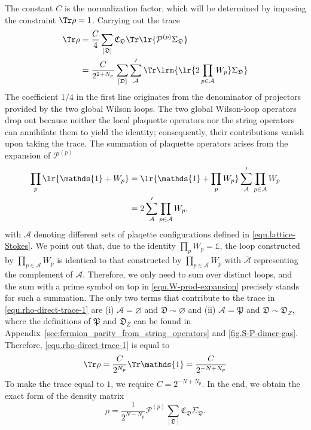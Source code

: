 The constant $C$ is the normalization factor, which will be determined by imposing the constraint $\Tr\rho = 1$. Carrying out the trace 
\begin{align}\label{equ.rho-direct-trace-1}
    \Tr\rho &= \frac{C}{4} \sum_{[\mathfrak{D}]} \mathfrak{C}_{\mathfrak{D}} \Tr\lr{\mathcal{P}^{(p)}\Sigma_{\mathfrak{D}}} \nonumber\\
    &= \frac{C}{2^{2+N_p}} \sum_{[\mathfrak{D}]} \sum_{\mathcal{A}}'\Tr\lrm{ \lr{2\prod_{p\in\mathcal{A}} W_p}\Sigma_{\mathfrak{D}}}
\end{align}
The coefficient $1/4$ in the first line originates from the denominator of projectors provided by the two global Wilson loops. The two global Wilson-loop operators drop out because neither the local plaquette operators nor the string operators can annihilate them to yield the identity; consequently, their contributions vanish upon taking the trace. The summation of plaquette operators arises from the expansion of $\mathcal{P}^{(p)}$
\begin{align}\label{equ.W-prod-expansion}
    \prod_{p}\lr{\mathds{1}+W_p} &= \lr{\mathds{1}+\prod_{p}W_p}\sum'_{\mathcal{A}}\prod_{p\in\mathcal{A}}W_p \nonumber\\
    &= 2\sum'_{\mathcal{A}}\prod_{p\in\mathcal{A}}W_p.
\end{align}
with $\mathcal{A}$ denoting different sets of plaqette configurations defined in \eqref{equ.lattice-Stokes}. We point out that, due to the identity $\prod_{p}W_p=\mathds{1}$, the loop constructed by $\prod_{p\in \mathcal{A}}W_p$ is identical to that constructed by $\prod_{p\in \overline{\mathcal{A}}}W_p$ with $\overline{\mathcal{A}}$ representing the complement of $\mathcal{A}$. Therefore, we only need to sum over distinct loops, and the sum with a prime symbol on top in \eqref{equ.W-prod-expansion} precisely stands for such a summation. The only two terms that contribute to the trace in \eqref{equ.rho-direct-trace-1} are (i) $\mathcal{A}=\varnothing$ and $\mathfrak{D}\sim \varnothing$ and (ii) $\mathcal{A}=\mathfrak{P}$ and $\mathfrak{D}\sim\mathfrak{D}_Z$, where the definitions of $\mathfrak{P}$ and $\mathfrak{D}_Z$ can be found in Appendix~\ref{sec:fermion_parity_from_string_operators} and \autoref{fig.S-P-dimer-gas}. Therefore, \eqref{equ.rho-direct-trace-1} is equal to 
\[
\Tr\rho = \frac{C}{2^{N_p}}\Tr\mathds{1} = \frac{C}{2^{-N+N_p}}
\]
To make the trace equal to $1$, we require $C = 2^{-N+N_p}$. In the end, we obtain the exact form of the density matrix
\begin{equation}\label{equ.density-matrix}
    \rho =  \frac{1}{2^{N-N_p}}\mathcal{P}^{(p)}\sum_{[\mathfrak{D}]}\mathfrak{C}_{\mathfrak{D}}\Sigma_{\mathfrak{D}}.
\end{equation}
